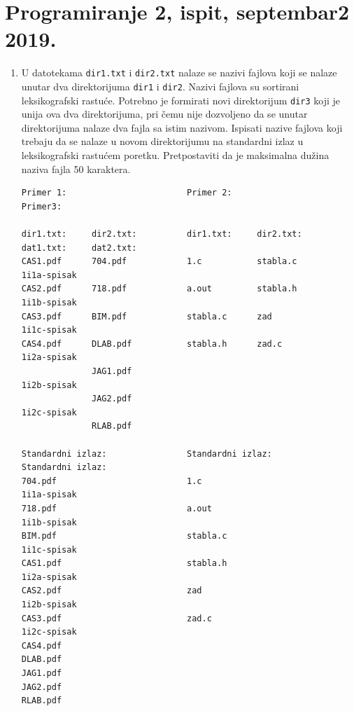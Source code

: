 \section{Programiranje 2, ispit, septembar2 2019.}


\begin{enumerate}
\item U datotekama \texttt{dir1.txt} i \texttt{dir2.txt} nalaze se nazivi fajlova koji se nalaze unutar dva direktorijuma \texttt{dir1} i \texttt{dir2}. Nazivi fajlova su sortirani leksikografski rastuće. Potrebno je formirati novi direktorijum \texttt{dir3} koji je unija ova dva direktorijuma, pri čemu nije dozvoljeno da se unutar direktorijuma nalaze dva fajla sa istim nazivom. Ispisati nazive fajlova koji trebaju da se nalaze u novom direktorijumu na standardni izlaz u leksikografski rastućem poretku. Pretpostaviti da je maksimalna dužina naziva fajla 50 karaktera.
\begin{verbatim}
Primer 1:                        Primer 2:                        Primer3:           

dir1.txt:     dir2.txt:          dir1.txt:     dir2.txt:          dat1.txt:     dat2.txt:           
CAS1.pdf      704.pdf            1.c           stabla.c                         1i1a-spisak
CAS2.pdf      718.pdf            a.out         stabla.h                         1i1b-spisak
CAS3.pdf      BIM.pdf            stabla.c      zad                              1i1c-spisak
CAS4.pdf      DLAB.pdf           stabla.h      zad.c                            1i2a-spisak
              JAG1.pdf                                                          1i2b-spisak
              JAG2.pdf                                                          1i2c-spisak
              RLAB.pdf

Standardni izlaz:                Standardni izlaz:                Standardni izlaz:   
704.pdf                          1.c                              1i1a-spisak
718.pdf                          a.out                            1i1b-spisak
BIM.pdf                          stabla.c                         1i1c-spisak
CAS1.pdf                         stabla.h                         1i2a-spisak
CAS2.pdf                         zad                              1i2b-spisak
CAS3.pdf                         zad.c                            1i2c-spisak
CAS4.pdf
DLAB.pdf
JAG1.pdf
JAG2.pdf
RLAB.pdf
\end{verbatim}


\end{enumerate}
